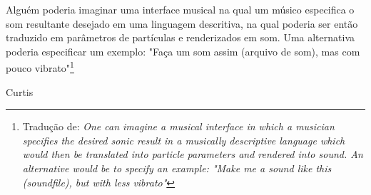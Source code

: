 \documentclass[
	12pt,				%
	openright,			%
	twoside,			%
	a4paper,			%
	english,			%
	french,				%
	spanish,			%
        italian,                        %
	brazil				%
	]{abntex2}
\begin{document}
\frenchspacing 

\pretextual

\imprimircapa

\imprimirfolhaderosto*

%


% 
%






\epigraph{Alguém poderia imaginar uma interface musical na qual um músico especifica o som resultante desejado em uma linguagem descritiva, na qual poderia ser então traduzido em parâmetros de partículas e renderizados em som. Uma alternativa poderia especificar um exemplo: "Faça um som assim (arquivo de som), mas com pouco vibrato"\footnote{Tradução de: \emph{One can imagine a musical interface in which a musician specifies the desired sonic result in a musically descriptive language which would then be translated into particle parameters and rendered into sound. An alternative would be to specify an example: "Make me a sound like this (soundfile), but with less vibrato"}}}{Curtis }
\newpage


%
\tableofcontents*
\cleardoublepage
\textual
\end{document}
